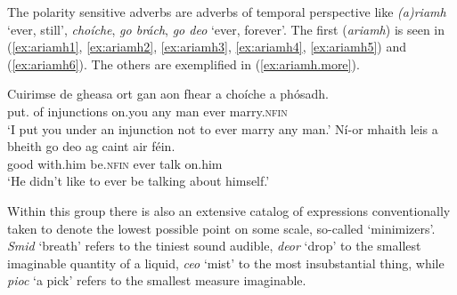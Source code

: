 \documentclass[output=paper,colorlinks,citecolor=brown]{langscibook}
\begin{document}

The polarity sensitive adverbs are adverbs of temporal perspective like \textit{(a)riamh} `ever, still', \textit{choíche}, \textit{go brách}, \textit{go deo} `ever, forever'. The first (\textit{ariamh}) is seen in (\ref{ex:ariamh1}, \ref{ex:ariamh2}, \ref{ex:ariamh3}, \ref{ex:ariamh4}, \ref{ex:ariamh5}) and (\ref{ex:ariamh6}). The others are exemplified in (\ref{ex:ariamh.more}).   

\ea\label{ex:ariamh.more}
\ea
\gll Cuirimse de gheasa ort gan aon fhear {a choíche} a  {phósadh}. \\
     {put\pres.\my} of injunctions on.you {\gan} any man ever {\vce} {marry.\textsc{nfin}} \\
\glt `I put you under an injunction not to ever marry any man.'
\ex
\gll Ní-or     mhaith leis {a bheith} {go deo} ag caint air féin. \\
     {\nior} good with.him    {be.\textsc{nfin}}  {ever} {\prog} talk {on.him} {\fein} \\     
\glt `He didn't like to ever be talking about himself.'
\z
\z


Within this group there is also an extensive catalog of expressions conventionally taken to denote the lowest possible point on some scale, so-called `minimizers'.  \textit{Smid} `breath' refers to the tiniest sound audible, \textit{deor} `drop' to the smallest imaginable quantity of a liquid, \textit{ceo} `mist' to the most insubstantial thing, while \textit{pioc} `a pick' refers to the smallest measure imaginable.
\end{document}
